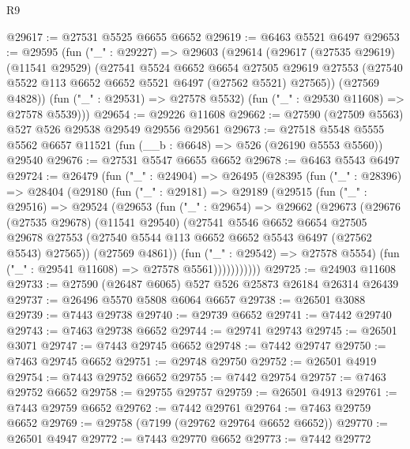 \begin{lexlean}{R9}
\begin{coremodule}
@29617 := @27531 @5525 @6655 @6652
@29619 := @6463 @5521 @6497
@29653 := @29595
    (fun ("_" : @29227) =>
    @29603
      (@29614
        (@29617
          (@27535 @29619)
          (@11541 @29529)
          (@27541
            @5524
            @6652
            @6654
            @27505
            @29619
            @27553
            (@27540 @5522 @113 @6652 @6652 @5521 @6497 (@27562 @5521) @27565))
          (@27569 @4828))
        (fun ("_" : @29531) => @27578 @5532)
        (fun ("_" : @29530 @11608) => @27578 @5539)))
@29654 := @29226 @11608
@29662 := @27590 (@27509 @5563) @527 @526 @29538 @29549 @29556 @29561
@29673 := @27518
    @5548
    @5555
    @5562
    @6657
    @11521
    (fun (__b : @6648) => @526 (@26190 @5553 @5560))
    @29540
@29676 := @27531 @5547 @6655 @6652
@29678 := @6463 @5543 @6497
@29724 := @26479
    (fun ("_" : @24904) =>
    @26495
      (@28395
        (fun ("_" : @28396) =>
        @28404
          (@29180
            (fun ("_" : @29181) =>
            @29189
              (@29515
                (fun ("_" : @29516) =>
                @29524
                  (@29653
                    (fun ("_" : @29654) =>
                    @29662
                      (@29673
                        (@29676
                          (@27535 @29678)
                          (@11541 @29540)
                          (@27541
                            @5546
                            @6652
                            @6654
                            @27505
                            @29678
                            @27553
                            (@27540 @5544 @113 @6652 @6652 @5543 @6497 (@27562 @5543) @27565))
                          (@27569 @4861))
                        (fun ("_" : @29542) => @27578 @5554)
                        (fun ("_" : @29541 @11608) => @27578 @5561)))))))))))
@29725 := @24903 @11608
@29733 := @27590 (@26487 @6065) @527 @526 @25873 @26184 @26314 @26439
@29737 := @26496 @5570 @5808 @6064 @6657
@29738 := @26501 @3088
@29739 := @7443 @29738
@29740 := @29739 @6652
@29741 := @7442 @29740
@29743 := @7463 @29738 @6652
@29744 := @29741 @29743
@29745 := @26501 @3071
@29747 := @7443 @29745 @6652
@29748 := @7442 @29747
@29750 := @7463 @29745 @6652
@29751 := @29748 @29750
@29752 := @26501 @4919
@29754 := @7443 @29752 @6652
@29755 := @7442 @29754
@29757 := @7463 @29752 @6652
@29758 := @29755 @29757
@29759 := @26501 @4913
@29761 := @7443 @29759 @6652
@29762 := @7442 @29761
@29764 := @7463 @29759 @6652
@29769 := @29758 (@7199 (@29762 @29764 @6652 @6652))
@29770 := @26501 @4947
@29772 := @7443 @29770 @6652
@29773 := @7442 @29772

\end{coremodule}
\end{lexlean}
